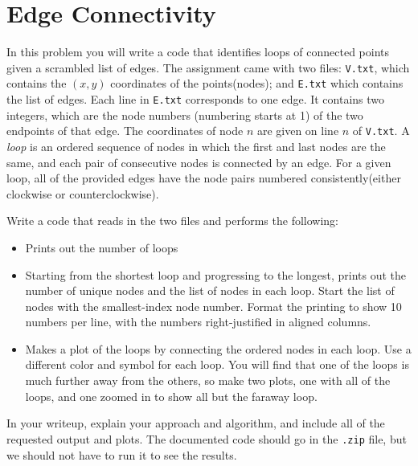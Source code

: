 \pagebreak
\section{Edge Connectivity}
In this problem you will write a code that identifies loops of connected points given a scrambled list of edges. The assignment came with two files: {\tt{V.txt}}, which contains the $(x, y)$ coordinates of the points(nodes); and {\tt{E.txt}} which contains the list of edges.  Each line in {\tt{E.txt}} corresponds to one edge. It contains two integers, which are the node numbers (numbering starts at 1) of the two endpoints of that edge. The coordinates of node $n$ are given on line $n$ of {\tt{V.txt}}. A \textit{loop} is an ordered sequence of nodes in which the first and last nodes are the same, and each pair of consecutive nodes is connected by an edge. For a given loop, all of the provided edges have the node pairs numbered consistently(either clockwise or counterclockwise).

Write a code that reads in the two files and performs the following:
\begin{itemize}
    \item Prints out the number of loops
    \item Starting from the shortest loop and progressing to the longest, prints out the number of unique nodes and the list of nodes in each loop.  Start the list of nodes with the smallest-index node number.  Format the printing to show 10 numbers per line, with the numbers right-justified in aligned columns.
    \item Makes a plot of the loops by connecting the ordered nodes in each loop.  Use a different color and symbol for each loop.  You will find that one of the loops is much further away from the others, so make two plots, one with all of the loops, and one zoomed in to show all but the faraway loop.
\end{itemize}

In your writeup, explain your approach and algorithm, and include all of the requested output and plots.  The documented code should go in the {\tt.zip} file, but we should not have to run it to see the results.


